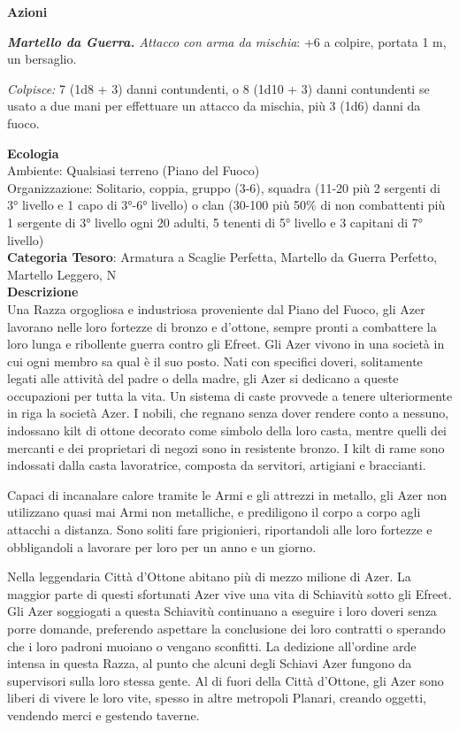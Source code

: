\begin{multicols}{2}
{\textbf{Azioni}

\emph{\textbf{Martello da Guerra.} Attacco con arma da mischia}: +6 a colpire, portata 1 m, un bersaglio.

\emph{Colpisce:} 7 (1d8 + 3) danni contundenti, o 8 (1d10 + 3) danni contundenti se usato a due mani per effettuare un attacco da mischia, più 3 (1d6) danni da fuoco.

\textbf{Ecologia}\\
Ambiente: Qualsiasi terreno (Piano del Fuoco)\\
Organizzazione: Solitario, coppia, gruppo (3-6), squadra (11-20 più 2 sergenti di 3° livello e 1 capo di 3°-6° livello) o clan (30-100 più 50\% di non combattenti più 1 sergente di 3° livello ogni 20 adulti, 5 tenenti di 5° livello e 3 capitani di 7° livello)\\
\textbf{Categoria Tesoro}: Armatura a Scaglie Perfetta, Martello da Guerra Perfetto, Martello Leggero, N\\
\textbf{Descrizione}\\
Una Razza orgogliosa e industriosa proveniente dal Piano del Fuoco, gli Azer lavorano nelle loro fortezze di bronzo e d'ottone, sempre pronti a combattere la loro lunga e ribollente guerra contro gli Efreet. Gli Azer vivono in una società in cui ogni membro sa qual è il suo posto. Nati con specifici doveri, solitamente legati alle attività del padre o della madre, gli Azer si dedicano a queste occupazioni per tutta la vita. Un sistema di caste provvede a tenere ulteriormente in riga la società Azer. I nobili, che regnano senza dover rendere conto a nessuno, indossano kilt di ottone decorato come simbolo della loro casta, mentre quelli dei mercanti e dei proprietari di negozi sono in resistente bronzo. I kilt di rame sono indossati dalla casta lavoratrice, composta da servitori, artigiani e braccianti.

Capaci di incanalare calore tramite le Armi e gli attrezzi in metallo, gli Azer non utilizzano quasi mai Armi non metalliche, e prediligono il corpo a corpo agli attacchi a distanza. Sono soliti fare prigionieri, riportandoli alle loro fortezze e obbligandoli a lavorare per loro per un anno e un giorno.

Nella leggendaria Città d'Ottone abitano più di mezzo milione di Azer. La maggior parte di questi sfortunati Azer vive una vita di Schiavitù sotto gli Efreet. Gli Azer soggiogati a questa Schiavitù continuano a eseguire i loro doveri senza porre domande, preferendo aspettare la conclusione dei loro contratti o sperando che i loro padroni muoiano o vengano sconfitti. La dedizione all'ordine arde intensa in questa Razza, al punto che alcuni degli Schiavi Azer fungono da supervisori sulla loro stessa gente. Al di fuori della Città d'Ottone, gli Azer sono liberi di vivere le loro vite, spesso in altre metropoli Planari, creando oggetti, vendendo merci e gestendo taverne.

}
\end{multicols}
